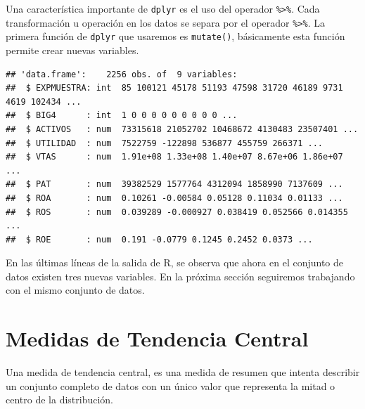 \documentclass[letterpaper,]{book}
\newenvironment{Shaded}{\begin{snugshade}}{\end{snugshade}}
\newcommand{\DataTypeTok}[1]{\textcolor[rgb]{0.13,0.29,0.53}{#1}}
\newcommand{\KeywordTok}[1]{\textcolor[rgb]{0.13,0.29,0.53}{\textbf{#1}}}
\newcommand{\NormalTok}[1]{#1}
\newcommand{\OperatorTok}[1]{\textcolor[rgb]{0.81,0.36,0.00}{\textbf{#1}}}
\newcommand{\StringTok}[1]{\textcolor[rgb]{0.31,0.60,0.02}{#1}}
\begin{document}
Una característica importante de \texttt{dplyr} es el uso del operador \texttt{\%\textgreater{}\%}. Cada transformación u operación en los datos se separa por el operador \texttt{\%\textgreater{}\%}. La primera función de \texttt{dplyr} que usaremos es \texttt{mutate()}, básicamente esta función permite crear nuevas variables.

\begin{Shaded}
\end{Shaded}

\begin{verbatim}
## 'data.frame':    2256 obs. of  9 variables:
##  $ EXPMUESTRA: int  85 100121 45178 51193 47598 31720 46189 9731 4619 102434 ...
##  $ BIG4      : int  1 0 0 0 0 0 0 0 0 0 ...
##  $ ACTIVOS   : num  73315618 21052702 10468672 4130483 23507401 ...
##  $ UTILIDAD  : num  7522759 -122898 536877 455759 266371 ...
##  $ VTAS      : num  1.91e+08 1.33e+08 1.40e+07 8.67e+06 1.86e+07 ...
##  $ PAT       : num  39382529 1577764 4312094 1858990 7137609 ...
##  $ ROA       : num  0.10261 -0.00584 0.05128 0.11034 0.01133 ...
##  $ ROS       : num  0.039289 -0.000927 0.038419 0.052566 0.014355 ...
##  $ ROE       : num  0.191 -0.0779 0.1245 0.2452 0.0373 ...
\end{verbatim}

En las últimas líneas de la salida de R, se observa que ahora en el conjunto de datos existen tres nuevas variables. En la próxima sección seguiremos trabajando con el mismo conjunto de datos.

\newpage

\hypertarget{tendcentr}{%
\section{Medidas de Tendencia Central}\label{tendcentr}}

Una medida de tendencia central, es una medida de resumen que intenta describir un conjunto completo de datos con un único valor que representa la mitad o centro de la distribución.
\end{document}
